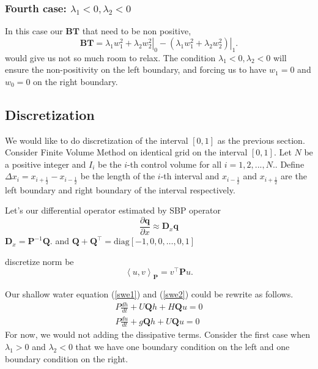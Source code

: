 \documentclass{article}
\newcommand{\half}{\frac{1}{2}}
\theoremstyle{definition}
\begin{document}
        \subsubsection{Fourth case: $\lambda_1 <0, \lambda_2 <0$}
        In this case our $\mathbf{BT}$ that need to be non positive,
        \begin{equation}
            \textbf{BT} 
            = \left.\lambda_1 w_1^2 + \lambda_2 w_2^2\right\vert_0
            - \left.(\lambda_1 w_1^2 + \lambda_2 w_2^2)\right\vert_1. 
        \end{equation}
        would give us not so much room to relax. The condition $\lambda_1 <0, \lambda_2 <0$ 
        will ensure the non-positivity on the left boundary, and forcing us to 
        have $w_1=0$ and $w_0=0$ on the right boundary. 
        


    


\subsection{Discretization}
    We would like to do discretization of the interval $[0,1]$ as the previous section. 
    Consider Finite Volume Method on identical grid on the interval $[0,1]$. 
    Let $N$ be a positive integer and $I_i$ be the $i$-th control volume for all $i=1,2,...,N.$.
    Define $\Delta x_i = x_{i+\half} - x_{i-\half}$ be the length of the $i$-th interval 
    and $x_{i-\frac12}$ and $x_{i+\frac12}$ are the left boundary and right boundary
    of the interval respectively. 

    Let's our differential operator estimated by SBP operator 
    \begin{equation}
        \frac{\partial \mathbf{q}}{\partial x} \approx \mathbf{D}_x \mathbf{q}
    \end{equation}
    $\mathbf{D}_x = \mathbf{P}^{-1}\mathbf{Q}$.
    and
    $\mathbf{Q+Q^\top} = \textrm{diag}[-1,0,0,\dots,0,1]$
    
    discretize norm be 
    \begin{equation}
        \left< u,v\right>_\mathbf{P} = v^\top \mathbf{P}u.
    \end{equation}

    Our shallow water equation (\ref{swe1}) and (\ref{swe2}) could be rewrite as follows.
    \begin{align}
        P \frac{dh}{dt} + U\mathbf{Q} h + H\mathbf{Q}u = 0\\
        P \frac{du}{dt} + g\mathbf{Q}h + U\mathbf{Q}u = 0
    \end{align}
    For now, we would not adding the dissipative terms. 
    Consider the first case when $\lambda_1 >0$ and $\lambda_2 <0$ 
    that we have one boundary condition on the left and one boundary condition on the right. 
\end{document}
